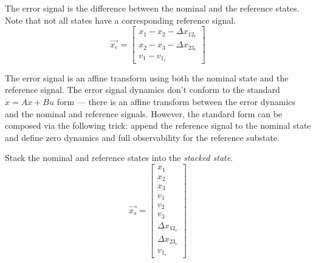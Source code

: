 \documentclass[12pt,onecolumn,reqno]{amsart}
\begin{document}
The error signal is the difference between the nominal and the reference states.
Note that not all states have a corresponding reference signal.
\begin{equation}
  \vec{x_{e}} = 
  \begin{bmatrix}
    x_{1} - x_{2} - \Delta x_{12_{r}} \\
    x_{2} - x_{3} - \Delta x_{23_{r}} \\
    v_{1} - v_{1_{r}}
  \end{bmatrix}
\end{equation}

The error signal is an affine transform using both the nominal state and the
reference signal. The error signal dynamics don't conform to the standard
$\dot{x} = Ax + Bu$ form --- there is an affine transform between the error
dynamics and the nominal and reference signals. However, the standard form can
be composed via the following trick: append the reference signal to the nominal
state and define zero dynamics and full observability for the reference
substate.

Stack the nominal and reference states into the \textit{stacked state}.
\begin{equation}
  \vec{x_{s}} = 
  \begin{bmatrix}
    x_{1}             \\
    x_{2}             \\
    x_{3}             \\
    v_{1}             \\
    v_{2}             \\
    v_{3}             \\ 
    \Delta x_{12_{r}} \\
    \Delta x_{23_{r}} \\
    v_{1_{r}}
  \end{bmatrix}
\end{equation}
\end{document}
